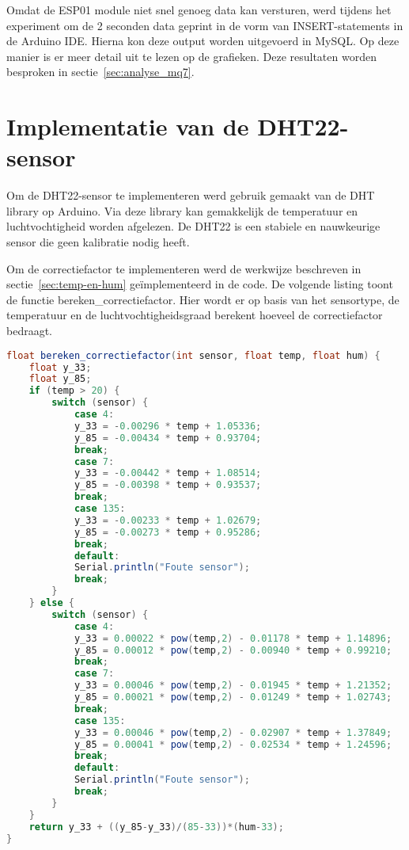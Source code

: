 Omdat de ESP01 module niet snel genoeg data kan versturen, werd tijdens het experiment om de 2 seconden data geprint in de vorm van INSERT-statements in de Arduino IDE. Hierna kon deze output worden uitgevoerd in MySQL. Op deze manier is er meer detail uit te lezen op de grafieken. Deze resultaten worden besproken in sectie~\ref{sec:analyse_mq7}.




\section{Implementatie van de DHT22-sensor}%
\label{sec:dht22}


Om de DHT22-sensor te implementeren werd gebruik gemaakt van de DHT library op Arduino. Via deze library kan gemakkelijk de temperatuur en luchtvochtigheid worden afgelezen. De DHT22 is een stabiele en nauwkeurige sensor die geen kalibratie nodig heeft.

Om de correctiefactor te implementeren werd de werkwijze beschreven in sectie~\ref{sec:temp-en-hum} geïmplementeerd in de code. De volgende listing toont de functie bereken\_correctiefactor. Hier wordt er op basis van het sensortype, de temperatuur en de luchtvochtigheidsgraad berekent hoeveel de correctiefactor bedraagt.

\begin{lstlisting}[language=Java,caption={Berekenen van de correctiefactor}]
float bereken_correctiefactor(int sensor, float temp, float hum) {
    float y_33;
    float y_85;
    if (temp > 20) {
        switch (sensor) {
            case 4:
            y_33 = -0.00296 * temp + 1.05336;
            y_85 = -0.00434 * temp + 0.93704;
            break;
            case 7:
            y_33 = -0.00442 * temp + 1.08514;
            y_85 = -0.00398 * temp + 0.93537;
            break;
            case 135:
            y_33 = -0.00233 * temp + 1.02679;
            y_85 = -0.00273 * temp + 0.95286;
            break;
            default:
            Serial.println("Foute sensor");
            break;
        }
    } else {
        switch (sensor) {
            case 4:
            y_33 = 0.00022 * pow(temp,2) - 0.01178 * temp + 1.14896;
            y_85 = 0.00012 * pow(temp,2) - 0.00940 * temp + 0.99210;
            break;
            case 7:
            y_33 = 0.00046 * pow(temp,2) - 0.01945 * temp + 1.21352;
            y_85 = 0.00021 * pow(temp,2) - 0.01249 * temp + 1.02743;
            break;
            case 135:
            y_33 = 0.00046 * pow(temp,2) - 0.02907 * temp + 1.37849;
            y_85 = 0.00041 * pow(temp,2) - 0.02534 * temp + 1.24596;
            break;
            default:
            Serial.println("Foute sensor");
            break;
        }
    }
    return y_33 + ((y_85-y_33)/(85-33))*(hum-33);
}
\end{lstlisting}



